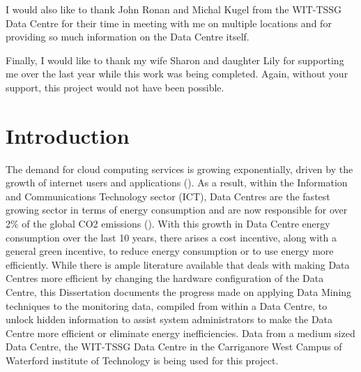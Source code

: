 \documentclass[12pt]{scrartcl}
\begin{document}
I would also like to thank John Ronan and Michal Kugel from the WIT-TSSG Data Centre for their time in meeting with me on multiple locations and for providing so much information on the Data Centre itself. 

Finally, I would like to thank my wife Sharon and daughter Lily for supporting me over the last year while this work was being completed. Again, without your support, this project would not have been possible.  

\newpage
\tableofcontents
\newpage
\listoffigures
\newpage
\newpage
\renewcommand\listoflistingscaption{List of Source Codes}
\listoflistings %
\newpage
{}







\section{Introduction}
\label{sec:[introduction]}
The demand for cloud computing services is growing exponentially, driven by the growth of internet users and applications (\cite{edssch.qt9c84f49g20130101}). As a result, within the Information and Communications Technology sector (ICT), Data Centres are the fastest growing sector in terms of energy consumption and are now responsible for over 2\% of the global CO2 emissions (\cite{edsbas.13818AC20170101}). With this growth in Data Centre energy consumption over the last 10 years, there arises a cost incentive, along with a general green incentive, to reduce energy consumption or to use energy more efficiently. While there is ample literature available that deals with making Data Centres more efficient by changing the hardware configuration of the Data Centre, this Dissertation documents the progress made on applying Data Mining techniques to the monitoring data, compiled from within a Data Centre, to unlock hidden information to assist system administrators to make the Data Centre more efficient or eliminate energy inefficiencies. Data from a medium sized Data Centre, the WIT-TSSG Data Centre in the Carriganore West Campus of Waterford institute of Technology is being used for this project.  
\end{document}
